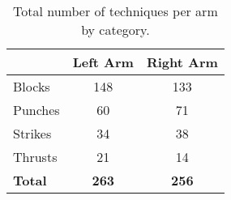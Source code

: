 \documentclass[10pt,twocolumn,a4paper]{article}
\begin{document}







\begin{table}
  \centering
  \begin{tabular}{l|c|c} \hline \hline
    & Left Arm & Right Arm \\ \hline

    Blocks    & 148   & 133 \\
    Punches   &  60   &  71 \\
    Strikes   &  34   &  38 \\
    Thrusts   &  21   &  14 \\
    \hline

    \textbf{Total}   & \textbf{263}   & \textbf{256} \\
    \hline
  \end{tabular}
  \caption{Total number of techniques per arm by category.}
  \end{table}
\end{document}
